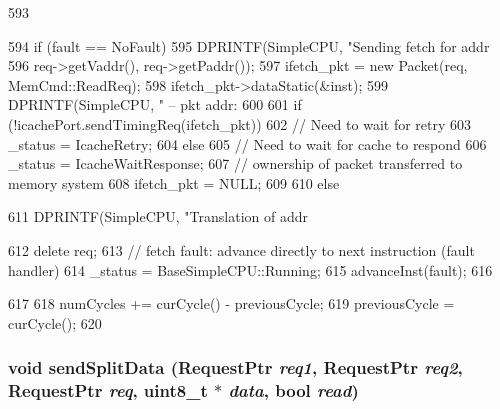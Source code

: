 \begin{DoxyCode}
593 {
594     if (fault == NoFault) {
595         DPRINTF(SimpleCPU, "Sending fetch for addr %
596                 req->getVaddr(), req->getPaddr());
597         ifetch_pkt = new Packet(req, MemCmd::ReadReq);
598         ifetch_pkt->dataStatic(&inst);
599         DPRINTF(SimpleCPU, " -- pkt addr: %
600 
601         if (!icachePort.sendTimingReq(ifetch_pkt)) {
602             // Need to wait for retry
603             _status = IcacheRetry;
604         } else {
605             // Need to wait for cache to respond
606             _status = IcacheWaitResponse;
607             // ownership of packet transferred to memory system
608             ifetch_pkt = NULL;
609         }
610     } else {
611         DPRINTF(SimpleCPU, "Translation of addr %
      
612         delete req;
613         // fetch fault: advance directly to next instruction (fault handler)
614         _status = BaseSimpleCPU::Running;
615         advanceInst(fault);
616     }
617 
618     numCycles += curCycle() - previousCycle;
619     previousCycle = curCycle();
620 }
\end{DoxyCode}
\hypertarget{classTimingSimpleCPU_a0894ae25efe60dc7855c057cab1684f9}{
\subsubsection[{sendSplitData}]{\setlength{\rightskip}{0pt plus 5cm}void sendSplitData ({\bf RequestPtr} {\em req1}, \/  {\bf RequestPtr} {\em req2}, \/  {\bf RequestPtr} {\em req}, \/  uint8\_\-t $\ast$ {\em data}, \/  bool {\em read})}}
\label{classTimingSimpleCPU_a0894ae25efe60dc7855c057cab1684f9}



